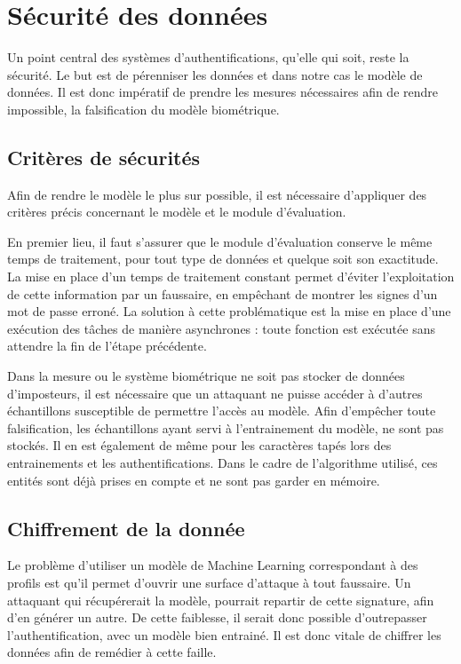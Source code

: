 \section{Sécurité des données}
Un point central des systèmes d'authentifications, qu'elle qui soit, reste la sécurité.
Le but est de pérenniser les données et dans notre cas le modèle de données. Il est donc impératif de prendre les mesures nécessaires afin de rendre impossible, la falsification du modèle biométrique.

\subsection{Critères de sécurités}
Afin de rendre le modèle le plus sur possible, il est nécessaire d'appliquer des critères précis concernant le modèle et le module d'évaluation.

En premier lieu, il faut s'assurer que le module d'évaluation conserve le même temps de traitement, pour tout type de données et quelque soit son exactitude. La mise en place d'un temps de traitement constant permet d'éviter l'exploitation de cette information par un faussaire, en empêchant de montrer les signes d'un mot de passe erroné.
La solution à cette problématique est la mise en place d'une exécution des tâches de manière asynchrones : toute fonction est exécutée sans attendre la fin de l'étape précédente.

Dans la mesure ou le système biométrique ne soit pas stocker de données d'imposteurs, il est nécessaire que un attaquant ne puisse accéder à d'autres échantillons susceptible de permettre l'accès au modèle.
Afin d'empêcher toute falsification, les échantillons ayant servi à l'entrainement du modèle, ne sont pas stockés. Il en est également de même pour les caractères tapés lors des entrainements et les authentifications.
Dans le cadre de l'algorithme utilisé, ces entités sont déjà prises en compte et ne sont pas garder en mémoire.

\subsection{Chiffrement de la donnée}
Le problème d'utiliser un modèle de Machine Learning correspondant à des profils est qu'il permet d'ouvrir une surface d'attaque à tout faussaire.
Un attaquant qui récupérerait la modèle, pourrait repartir de cette signature, afin d'en générer un autre. De cette faiblesse, il serait donc possible d'outrepasser l'authentification, avec un modèle bien entrainé.
Il est donc vitale de chiffrer les données afin de remédier à cette faille.

